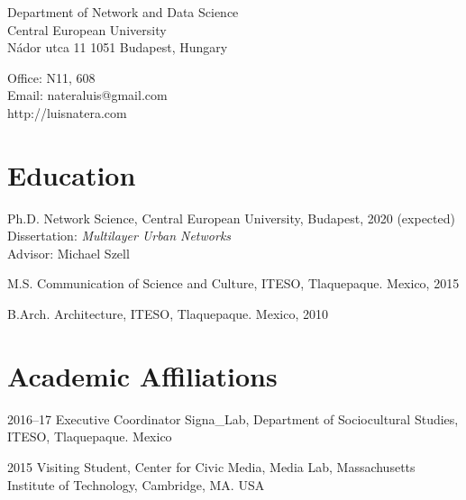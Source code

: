 \documentclass{academiccv}
\begin{document}
\raggedright

\namefont{\myname}

\vspace{1em}
\begin{minipage}[t]{0.495\textwidth}
  Department of Network and Data Science \\
  Central European University \\
  Nádor utca 11
  1051 Budapest, Hungary
\end{minipage}
\begin{minipage}[t]{0.495\textwidth}
  Office: N11, 608 \\
  Email: nateraluis@gmail.com \\
  http://luisnatera.com \\
\end{minipage}
\vspace{0.5em}



\section*{Education}

\begin{tablist}
	
\item[Ph.D. ] \tab Network Science, Central European University, Budapest, 2020 (expected) \\
                  Dissertation: \textit{Multilayer Urban Networks} \\
                  Advisor: Michael Szell
                  
\item[M.S.]  \tab Communication of Science and Culture, ITESO, Tlaquepaque. Mexico, 2015

\item[B.Arch.]  \tab Architecture,  ITESO, Tlaquepaque. Mexico, 2010

\end{tablist}



\section*{Academic Affiliations}

\begin{tablist}                     

\item[2016--17] \tab Executive Coordinator Signa\_Lab, Department of Sociocultural Studies, ITESO, Tlaquepaque. Mexico

\item[2015] \tab Visiting Student, Center for Civic Media,  Media Lab, Massachusetts Institute of Technology, Cambridge, MA. USA

\end{tablist}
\end{document}
